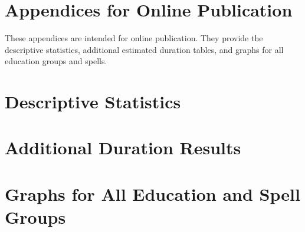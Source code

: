 \documentclass[12pt,letterpaper]{article}
\begin{document}
\clearpage

\onehalfspacing






\clearpage
\newpage

\appendix

\renewcommand\thefigure{\thesection.\arabic{figure}}    
\renewcommand\thetable{\thesection.\arabic{table}}    

\section*{Appendices for Online Publication}

These appendices are intended for online publication.
They provide the descriptive statistics, additional
estimated duration tables, and graphs for all 
education groups and spells.


\clearpage
\newpage

\section{Descriptive Statistics}
\setcounter{figure}{0}
\setcounter{table}{0}




\clearpage
\newpage

\section{Additional Duration Results}

\setcounter{figure}{0}
\setcounter{table}{0}

\vspace*{-0.51cm}







\clearpage

\section{Graphs for All Education and Spell Groups}
\end{document}
